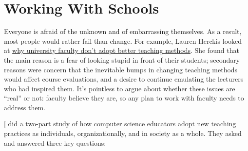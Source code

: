 \section{Working With Schools}\label{s:partner-schools}

Everyone is afraid of the unknown and of embarrassing themselves. As a
result, most people would rather fail than change. For example, Lauren
Herckis looked at \href{https://www.insidehighered.com/news/2017/07/06/anthropologist-studies-why-professors-dont-adopt-innovative-teaching-methods}{why university faculty don't adopt better teaching
methods}. She found that the main
reason is a fear of looking stupid in front of their students;
secondary reasons were concern that the inevitable bumps in changing
teaching methods would affect course evaluations, and a desire to
continue emulating the lecturers who had inspired them. It's pointless
to argue about whether these issues are ``real'' or not: faculty believe
they are, so any plan to work with faculty needs to address them.

{[}\protect[\hyperlink{b:Bark2015}{Bark2015}]{]} did a two-part study of how computer science
educators adopt new teaching practices as individuals, organizationally,
and in society as a whole. They asked and answered three key questions:

